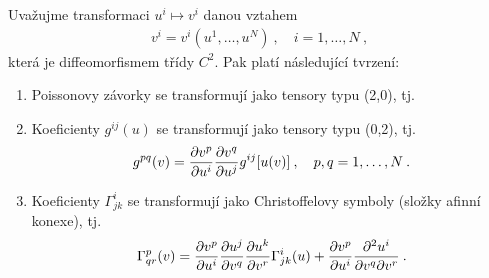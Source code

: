 \begin{proposition} \label{prop:transoformace}
    Uvažujme transformaci $u^i \mapsto v^i $  danou vztahem
    \begin{align}
        v^i = v^i (u^1, \dots, u^N) \:, \quad i = 1, \dots, N \:, \label{eq:transform}
    \end{align}
    která je diffeomorfismem třídy $C^2$.
    Pak platí následující tvrzení:
    \begin{enumerate}
        \item Poissonovy závorky se transformují jako tensory typu (2,0), tj.
        
        \item Koeficienty $g^{ij}(u)$ se transformují jako tensory typu (0,2), tj.
        \begin{align}
            g^{pq}(v) = \frac{\partial v^p}{\partial u^i} \frac{\partial v^q}{\partial u^j} g^{ij}[u(v)] \:, \quad p, q = 1, \dots, N \:. \label{eq:transformace-metrika}
        \end{align}
        \item Koeficienty $\Gamma^i_{jk}$ se transformují jako Christoffelovy symboly (složky afinní konexe), tj.
        \begin{align}
            \Gamma^p_{qr} (v) = \frac{\partial v^p}{\partial u^i} \frac{\partial u^j}{\partial v^q} \frac{\partial u^k}{\partial v^r} \Gamma^i_{jk}(u) + \frac{\partial v^p}{\partial u^i} \frac{\partial^2 u^i}{\partial v^q \partial v^r} \:. \label{eq:transformace-konexe}
        \end{align}
    \end{enumerate}
\end{proposition}

